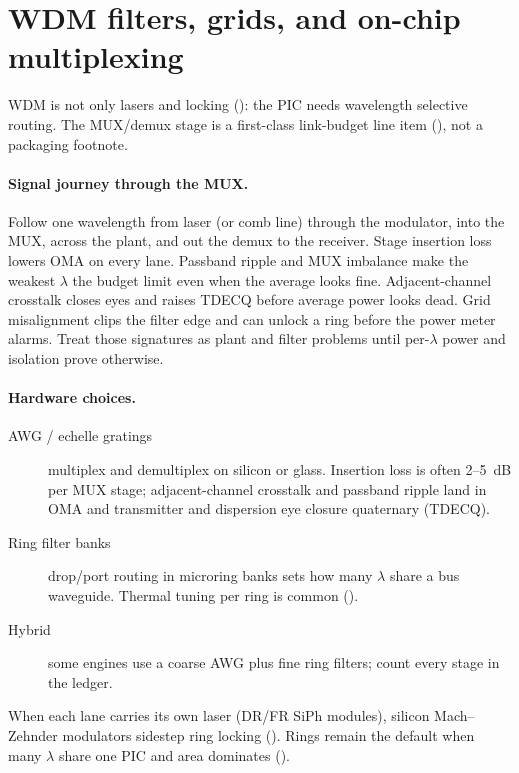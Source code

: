 \section{WDM filters, grids, and on-chip multiplexing}
\label{sec:wdm-hardware}

WDM is not only lasers and locking (): the PIC needs wavelength
selective routing. The MUX/demux stage is a first-class link-budget line item
(), not a packaging footnote.

\paragraph{Signal journey through the MUX.}
Follow one wavelength from laser (or comb line) through the modulator, into the
MUX, across the plant, and out the demux to the receiver. Stage insertion loss
lowers OMA on every lane. Passband ripple and MUX imbalance make the weakest
$\lambda$ the budget limit even when the average looks fine. Adjacent-channel
crosstalk closes eyes and raises TDECQ before average power looks dead. Grid
misalignment clips the filter edge and can unlock a ring before the power meter
alarms. Treat those signatures as plant and filter problems until per-$\lambda$
power and isolation prove otherwise.

\paragraph{Hardware choices.}
\begin{description}
\item[AWG / echelle gratings] multiplex and demultiplex on silicon or glass.
      Insertion loss is often 2--5~dB per MUX stage; adjacent-channel crosstalk and
      passband ripple land in OMA and transmitter and dispersion eye closure
      quaternary (TDECQ).
\item[Ring filter banks] drop/port routing in microring banks sets how many
      $\lambda$ share a bus waveguide. Thermal tuning per ring is common
      ().
\item[Hybrid] some engines use a coarse AWG plus fine ring filters; count every
      stage in the ledger.
\end{description}

 When each lane carries
its own laser (DR/FR SiPh modules), silicon Mach--Zehnder modulators sidestep ring
locking (). Rings remain the default when many $\lambda$ share one
PIC and area dominates ().

